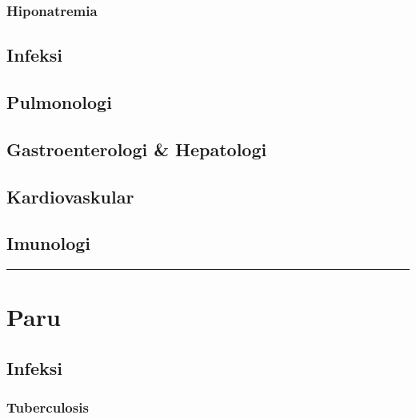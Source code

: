 \documentclass[
]{book}
\begin{document}
\hypertarget{hiponatremia}{%
\subsubsection{Hiponatremia}\label{hiponatremia}}

\hypertarget{infeksi}{%
\subsection{Infeksi}\label{infeksi}}

\hypertarget{pulmonologi}{%
\subsection{Pulmonologi}\label{pulmonologi}}

\hypertarget{gastroenterologi-hepatologi}{%
\subsection{Gastroenterologi \& Hepatologi}\label{gastroenterologi-hepatologi}}

\hypertarget{kardiovaskular-1}{%
\subsection{Kardiovaskular}\label{kardiovaskular-1}}

\hypertarget{imunologi}{%
\subsection{Imunologi}\label{imunologi}}

\begin{center}\rule{0.5\linewidth}{0.5pt}\end{center}

\hypertarget{paru}{%
\section{Paru}\label{paru}}

\hypertarget{infeksi-1}{%
\subsection{Infeksi}\label{infeksi-1}}

\hypertarget{tuberculosis}{%
\subsubsection{Tuberculosis}\label{tuberculosis}}
\end{document}
